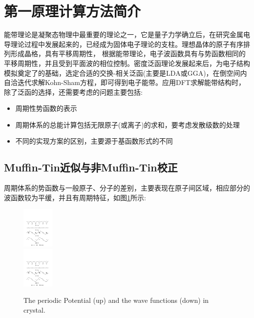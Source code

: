 {\section{第一原理计算方法简介}
能带理论是凝聚态物理中最重要的理论之一，它是量子力学确立后，在研究金属电导理论过程中发展起来的，已经成为固体电子理论的支柱。理想晶体的原子有序排列形成晶格，具有平移周期性，%
根据能带理论，电子波函数具有与势函数相同的平移周期性，并且受到平面波的相位控制。密度泛函理论发展起来后，为电子结构模拟奠定了的基础，选定合适的交换-相关泛函(主要是LDA或GGA)，在倒空间内自洽迭代求解Kohn-Sham方程，即可得到电子能带。应用DFT求解能带结构时，除了泛函的选择，还需要考虑的问题主要包括:
\begin{itemize}
	\item 周期性势函数的表示
	\item 周期体系的总能计算包括无限原子(或离子)的求和，要考虑发散级数的处理
	\item 不同的实现方案的区别，主要源于基函数形式的不同
\end{itemize}

\subsection{Muffin-Tin近似与非Muffin-Tin校正}
周期体系的势函数与一般原子、分子的差别，主要表现在原子间区域，相应部分的波函数较为平缓，并且有周期特征，如图\ref{Potential-Wave}所示:
\begin{figure}[h!]
\centering
\includegraphics[height=0.8in,width=4.in,viewport=41 458 539 546,clip]{Figures/Pseudo_wave.pdf}\\
\includegraphics[height=0.8in,width=4.in,viewport=41 238 539 339,clip]{Figures/Pseudo_wave.pdf}
\caption{\small \textrm{The periodic Potential (up) and the wave functions (down) in crystal.}}%
\label{Potential-Wave}
\end{figure}

}
